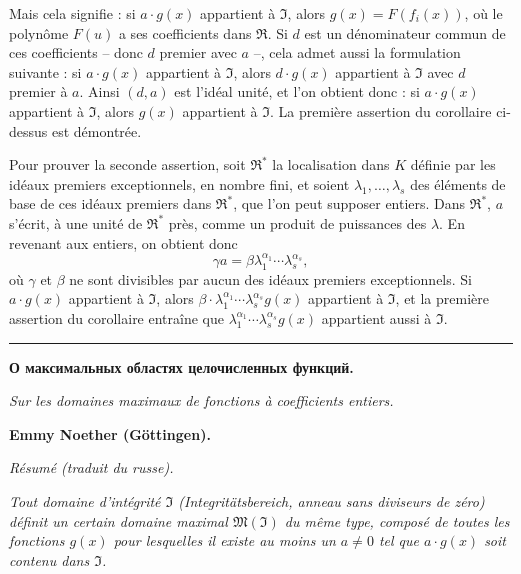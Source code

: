 Mais cela signifie : si $a\cdot g(x)$ appartient à $\mathfrak{I}$, alors $g(x)=F(f_i(x))$, où le polynôme $F(u)$ a ses coefficients dans $\mathfrak{R}$. Si $d$ est un dénominateur commun de ces coefficients -- donc $d$ premier avec $a$ --, cela admet aussi la formulation suivante : si $a\cdot g(x)$ appartient à $\mathfrak{I}$, alors $d\cdot g(x)$ appartient à $\mathfrak{I}$ avec $d$ premier à $a$. Ainsi $(d,a)$ est l'idéal unité, et l'on obtient donc : si $a\cdot g(x)$ appartient à $\mathfrak{I}$, alors $g(x)$ appartient à $\mathfrak{I}$. La première assertion du corollaire ci-dessus est démontrée.

Pour prouver la seconde assertion, soit $\mathfrak{R}^*$ la localisation dans $K$ définie par les idéaux premiers exceptionnels, en nombre fini, et soient $\lambda_1,\ldots,\lambda_s$ des éléments de base de ces idéaux premiers dans $\mathfrak{R}^*$, que l'on peut supposer entiers. Dans $\mathfrak{R}^*$, $a$ s'écrit, à une unité de $\mathfrak{R}^*$ près, comme un produit de puissances des $\lambda$. En revenant aux entiers, on obtient donc
\[
\gamma a=\beta\lambda_1^{\alpha_1}\cdots\lambda_s^{\alpha_s},
\]
où $\gamma$ et $\beta$ ne sont divisibles par aucun des idéaux premiers exceptionnels. Si $a\cdot g(x)$ appartient à $\mathfrak{I}$, alors $\beta\cdot\lambda_1^{\alpha_1}\cdots\lambda_s^{\alpha_s}g(x)$ appartient à $\mathfrak{I}$, et la première assertion du corollaire entraîne que $\lambda_1^{\alpha_1}\cdots\lambda_s^{\alpha_s}g(x)$ appartient aussi à $\mathfrak{I}$.

\bigskip
\noindent\rule{\textwidth}{0.4pt}

\medskip
\begingroup
\begin{center}
{\Large\bfseries О максимальных областях целочисленных функций.}\par
\vspace{0.4em}
{\itshape Sur les domaines maximaux de fonctions à coefficients entiers.}\par
\vspace{0.6em}
{\bfseries Emmy Noether (Göttingen).}\par
\vspace{0.4em}
\emph{Résumé (traduit du russe).}
\end{center}

\smallskip
\textit{Tout domaine d'intégrité $\mathfrak{I}$ (Integritätsbereich, anneau sans diviseurs de zéro) définit un certain domaine maximal $\mathfrak{M}(\mathfrak{I})$ du même type, composé de toutes les fonctions $g(x)$ pour lesquelles il existe au moins un $a\ne0$ tel que $a\cdot g(x)$ soit contenu dans $\mathfrak{I}$.}

